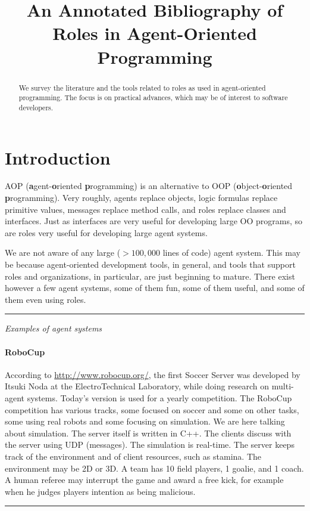 \documentclass{article}
\title{An Annotated Bibliography of Roles in Agent-Oriented Programming}
\newcommand{\fb}[1]{\textbf{#1}}
\newenvironment{notes}{\medskip\hrule\smallskip\narrower}{\smallskip\hrule\medskip}
\begin{document}
\maketitle

\begin{abstract}
We survey the literature and the tools related to roles as used in agent-oriented programming.
The focus is on practical advances, which may be of interest to software developers.
\end{abstract}

\section{Introduction}\label{sec:introduction} %

AOP (\fb agent-\fb oriented \fb programming) is an alternative to OOP (\fb object-\fb oriented \fb programming).
Very roughly, agents replace objects, logic formulas replace primitive values, messages replace method calls, and roles replace classes and interfaces.
Just as interfaces are very useful for developing large OO programs, so are roles very useful for developing large agent systems.

We are not aware of any large ($>100{,}000$ lines of code) agent system.
This may be because agent-oriented development tools, in general, and tools that support roles and organizations, in particular, are just beginning to mature.
There exist however a few agent systems, some of them fun, some of them useful, and some of them even using roles.

\begin{notes}
\emph{Examples of agent systems}

\paragraph{RoboCup}
According to \url{http://www.robocup.org/}, the first Soccer Server was developed by Itsuki Noda at the ElectroTechnical Laboratory, while doing research on multi-agent systems.
Today's version is used for a yearly competition.
The RoboCup competition has various tracks, some focused on soccer and some on other tasks, some using real robots and some focusing on simulation.
We are here talking about simulation.
The server itself is written in C++.
The clients discuss with the server using UDP (messages).
The simulation is real-time.
The server keeps track of the environment and of client resources, such as stamina.
The environment may be 2D or 3D\null.
A team has 10 field players, 1 goalie, and 1 coach.
A human referee may interrupt the game and award a free kick, for example when he judges players intention as being malicious.

\end{notes}
\end{document}
